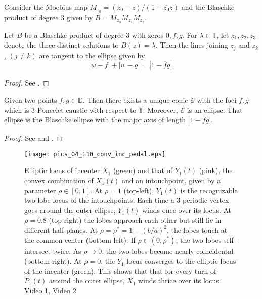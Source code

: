 Consider the Moebius map $M_{z_0}=(z_0-z)/(1-\overline{z_0} z)$ and the Blaschke product of degree 3 given by   $B=M_{z_0} M_{z_1} M_{z_2}$.
\begin{theorem}
Let $B$ be a Blaschke product of degree 3 with
zeros $0, f, g.$ For $\lambda \in \mathbb{T}$, let $z_1, z_2, z_3 $ denote the three distinct solutions to $ B(z) = \lambda$. Then the
lines joining $z_j$ and $z_k$, $(j \ne k)$ are tangent to the ellipse given by
\[|w - f| + |w - g| = |1 -   \overline{f}   g |.\]
\end{theorem}
\begin{proof}
See \cite[Theorem 2.9, page 37]{daepp-2019}.
\end{proof}

\begin{theorem}
 Given two points $f,g\in\mathbb{D}$. Then there exists a unique conic $\mathcal{E}$ with the foci
$f,g$   which is 3-Poncelet caustic with respect to $\mathbb{T}$. Moreover, $\mathcal{E}$ is an ellipse. That ellipse is
the Blaschke ellipse with the major axis of length $|1-\overline{f}g|.$
\end{theorem}

\begin{proof}
See \cite[Corollary 4.4, page 44]{daepp-2019} and \cite{drag-milena2021}.
\end{proof}

\begin{figure}
    \centering
    \texttt{[image: pics\_04\_110\_conv\_inc\_pedal.eps]}
    \caption{Elliptic locus of incenter $X_1$ (green) and that of $Y_1(t)$ (pink), the convex combination of $X_1(t)$ and an intouchpoint, given by a parameter $\rho\in[0,1]$. At $\rho=1$ (top-left), $Y_1(t)$ is the recognizable two-lobe locus of the intouchpoints. Each time a 3-periodic vertex goes around the outer ellipse, $Y_1(t)$ winds once over its locus. At $\rho=0.8$ (top-right) the lobes approach each other but still lie in different half planes. At $\rho=\rho^*=1-(b/a)^2$, the lobes touch at the common center (bottom-left). If $\rho\in(0,\rho^*)$, the two lobes self-intersect twice. As $\rho{\rightarrow}0$, the two lobes become nearly coincidental (bottom-right). At $\rho=0$, the $Y_1$ locus converges to the elliptic locus of the incenter (green). This shows that that for every turn of $P_1(t)$ around the outer ellipse, $X_1$ winds thrice over its locus. \href{https://youtu.be/3Gr3Nh5-jHs}{Video 1}, \href{https://youtu.be/HZFjkWD_CnE}{Video 2}}
    \label{fig:inc-wind3}
\end{figure}
 



